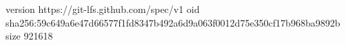 version https://git-lfs.github.com/spec/v1
oid sha256:59c649a6e47d66577f1fd8347b492a6d9a063f0012d75e350cf17b968ba9892b
size 921618
